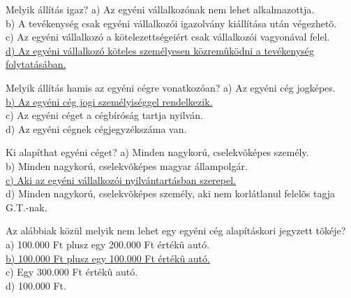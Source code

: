\begin{frame}

\begin{tcolorbox}[title={87. Kérdés}]
Melyik állítás igaz?
\tcblower
a) Az egyéni vállalkozónak nem lehet alkalmazottja.\\
b) A tevékenység csak egyéni vállalkozói igazolvány kiállítása után végezhetõ.\\
c) Az egyéni vállalkozó a kötelezettségeiért csak vállalkozói vagyonával felel. \\
\uline {d) Az egyéni vállalkozó köteles személyesen közremûködni a tevékenység folytatásában.}
\end{tcolorbox}

\begin{tcolorbox}[title={88. Kérdés}]
Melyik állítás hamis az egyéni cégre vonatkozóan?
\tcblower
a) Az egyéni cég jogképes.\\
\uline {b) Az egyéni cég jogi személyiséggel rendelkezik.}\\
c) Az egyéni céget a cégbíróság tartja nyilván.\\
d) Az egyéni cégnek cégjegyzékszáma van.
\end{tcolorbox}

\begin{tcolorbox}[title={89. Kérdés}]
Ki alapíthat egyéni céget?
\tcblower
a) Minden nagykorú, cselekvõképes személy.\\
b) Minden nagykorú, cselekvõképes magyar állampolgár.\\
\uline {c) Aki az egyéni vállalkozói nyilvántartásban szerepel.}\\
d) Minden nagykorú, cselekvõképes személy, aki nem korlátlanul felelõs tagja G.T.-nak.
\end{tcolorbox}

\begin{tcolorbox}[title={90. Kérdés}]
Az alábbiak közül melyik nem lehet egy egyéni cég alapításkori jegyzett tõkéje?
\tcblower
a) 100.000 Ft plusz egy 200.000 Ft értékû autó.\\
\uline {b) 100.000 Ft plusz egy 100.000 Ft értékû autó.}\\
c) Egy 300.000 Ft értékû autó. \\
d) 100.000 Ft.
\end{tcolorbox}

\end{frame}


